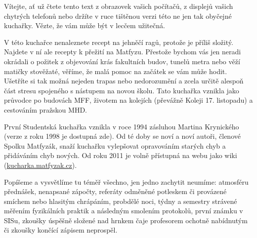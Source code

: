 \noindent Vítejte, ať už čtete tento text z obrazovek vašich počítačů,
z displejů vašich chytrých telefonů nebo držíte v ruce tištěnou verzi této ne
jen tak obyčejné kuchařky. Vězte, že vám může být v lecčem užitečná.


V této kuchařce nenaleznete recept na jehněčí ragů, protože je příliš složitý.
Najdete v ní ale recepty k přežití na Matfyzu.
Přestože bychom vás jen neradi okrádali o požitek z objevování krás
fakultních budov, tunelů metra nebo věží matičky stověžaté, věříme,
že malá pomoc na začátek se vám může hodit.
Ušetříte si tak možná nejeden trapas nebo nedorozumění a zcela určitě
alespoň část stresu spojeného s nástupem na novou školu.
Tato kuchařka vznikla jako průvodce po budovách MFF,
životem na kolejích (převážně Koleji 17. listopadu) a cestováním pražskou MHD.


První Studentská kuchařka vznikla v roce 1994 zásluhou Martina Krynického
(verze z roku 1998 je dostupná zde).
Od té doby se noví a noví autoři, členové Spolku Matfyzák,
snaží kuchařku vylepšovat opravováním starých chyb a přidáváním chyb nových.
Od roku 2011 je volně přístupná na webu jako wiki
(\url{kucharka.matfyzak.cz}).


Popíšeme a vysvětlíme tu téměř všechno, jen jedno zachytit neumíme:
atmosféru přednášek, nenapsané zápočty, referáty odměněné potleskem
či provázené smíchem nebo hlasitým chrápáním, probdělé noci,
týdny a semestry strávené měřením fyzikálních praktik a následným
smolením protokolů, první známku v SISu, zkoušky úspěšně složené
nad hrnkem čaje profesorem ochotně nabídnutým či zkoušky končící
zápisem neprospěl.